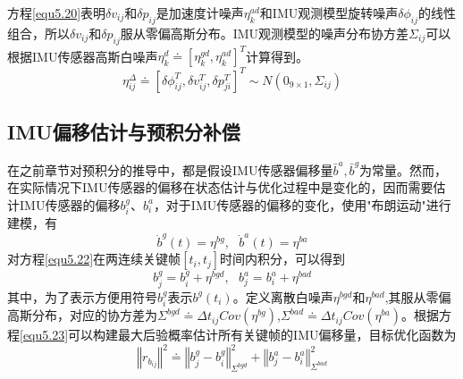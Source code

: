 方程\ref{equ5.20}表明$\delta v_{ij}$和$\delta p_{ij}$是加速度计噪声$\eta_k^{ad}$和IMU观测模型旋转噪声$\delta \phi_{ij}$的线性组合，所以$\delta v_{ij}$和$\delta p_{ij}$服从零偏高斯分布。IMU观测模型的噪声分布协方差$\Sigma_{ij}$可以根据IMU传感器高斯白噪声$\eta_k^d \doteq [\eta_k^{gd}, \eta_k^{ad}]^T$计算得到。
\begin{equation}
\label{equ5.21}
\eta_{ij}^{\Delta} \doteq \left[ \delta \phi_{ij}^T, \delta v_{ij}^T, \delta p_{ji}^T \right]^T \sim N \left( 0_{9 \times 1}, \Sigma_{ij}  \right)
\end{equation}


\subsection{IMU偏移估计与预积分补偿}
在之前章节对预积分的推导中，都是假设IMU传感器偏移量${\bar{b}^a, \bar{b}^g}$为常量。然而，在实际情况下IMU传感器的偏移在状态估计与优化过程中是变化的，因而需要估计IMU传感器的偏移$b_i^g$、$b_i^a$，对于IMU传感器的偏移的变化，使用"布朗运动"进行建模，有
\begin{equation}
\label{equ5.22}
\dot{b}^g(t) = \eta^{bg}, \ \ \ \dot{b}^a(t) = \eta^{ba}
\end{equation}
对方程\ref{equ5.22}在两连续关键帧$[t_i,t_j]$时间内积分，可以得到
\begin{equation}
\label{equ5.23}
b_j^g = b_i^g+\eta^{bgd}, \ \ \ b_j^a = b_i^a+\eta^{bad}
\end{equation}
其中，为了表示方便用符号$b_i^g$表示$b^g(t_i)$。定义离散白噪声$\eta^{bgd}$和$\eta^{bad}$,其服从零偏高斯分布，对应的协方差为$\Sigma^{bgd} \doteq \Delta t_{ij} Cov(\eta^{bg}) $,$\Sigma^{bad} \doteq \Delta t_{ij} Cov(\eta^{ba})$。根据方程\ref{equ5.23}可以构建最大后验概率估计所有关键帧的IMU偏移量，目标优化函数为
\begin{equation}
\label{equ5.24}
\left\Vert r_{b_{ij}} \right\Vert ^2 \doteq \left\Vert b_j^g -b_i^g \right\Vert_{\Sigma^{bgd}}^2 + \left\Vert b_j^a -b_i^a \right\Vert_{\Sigma^{bad}}^2
\end{equation}

